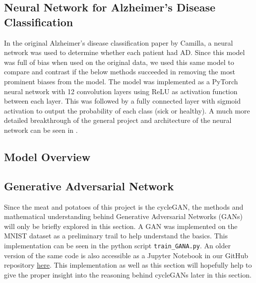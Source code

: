 \documentclass[12pt, fleqn, titlepage]{article}
\begin{document}
\subsection{Neural Network for Alzheimer's Disease Classification}
In the original Alzheimer's disease classification paper by Camilla, a neural network was used to determine whether each patient had AD. Since this model was full of bias when used on the original data, we used this same model to compare and contrast if the below methods succeeded in removing the most prominent biases from the model. The model was implemented as a PyTorch neural network with 12 convolution layers using ReLU as activation function between each layer. This was followed by a fully connected layer with sigmoid activation to output the probability of each class (sick or healthy). A much more detailed breakthrough of the general project and architecture of the neural network can be seen in \cite{CamillaKandidat}.

\subsection{Model Overview}

\subsection{Generative Adversarial Network}
Since the meat and potatoes of this project is the cycleGAN, the methods and mathematical understanding behind Generative Adversarial Networks (GANs) will only be briefly explored in this section. A GAN was implemented on the MNIST dataset as a preliminary trail to help understand the basics. This implementation can be seen in the python script \texttt{train\_GANA.py}. An older version of the same code is also accessible as a Jupyter Notebook in our GitHub repository  \href{https://github.com/oskarwiese/AlzPred/blob/main/preliminary/GAN_MNIST.ipynb}{here}. This implementation as well as this section will hopefully help to give the proper insight into the reasoning behind cycleGANs later in this section.
\end{document}
